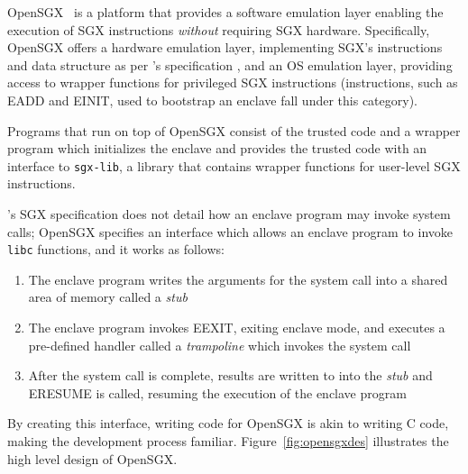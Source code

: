 \documentclass[../main.tex]{subfiles}
\begin{document}
OpenSGX~\cite{opensgx} is a platform that provides a
software emulation layer enabling the execution of SGX instructions
\textit{without} requiring SGX hardware. Specifically, OpenSGX
offers a hardware emulation layer, implementing SGX's instructions
and data structure as per \Intel's specification \footnotemark, and an
OS emulation layer, providing access to wrapper functions for
privileged SGX instructions (instructions, such as EADD and EINIT,
used to bootstrap an enclave fall under this category)\footnotemark.

Programs that run on top of OpenSGX consist of the trusted code and a
wrapper program which initializes the enclave and provides the trusted
code with an interface to \texttt{sgx-lib}, a library that contains
wrapper functions for user-level SGX instructions.

\Intel's SGX specification does not detail how an enclave program may
invoke system calls\footnotemark; OpenSGX specifies an interface which
allows an enclave program to invoke \texttt{libc} functions, and it
works as follows:

\begin{enumerate}
  \item The enclave program writes the arguments for the system call
    into a shared area of memory called a \textit{stub}
  \item The enclave program invokes EEXIT, exiting enclave mode, and
    executes a pre-defined handler called a \textit{trampoline} which
    invokes the system call
  \item After the system call is complete, results are written to into
    the \textit{stub} and ERESUME is called, resuming the execution of the
    enclave program
\end{enumerate} By creating this interface, writing code for OpenSGX
is akin to writing C code, making the development process
familiar. Figure~\ref{fig:opensgxdes} illustrates the high level
design of OpenSGX.
\end{document}
